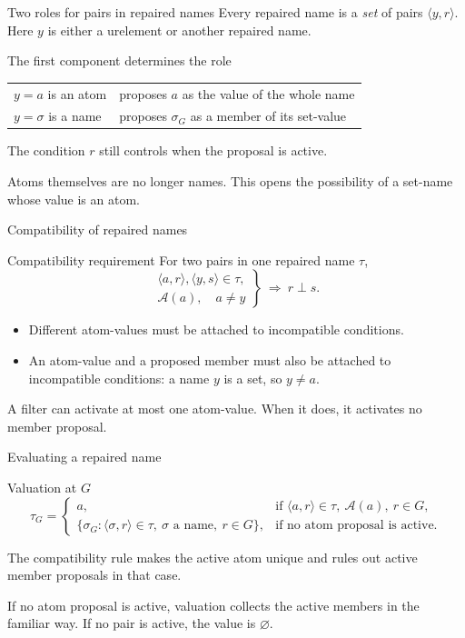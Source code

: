 \documentclass[aspectratio=169,11pt]{beamer}
\begin{document}
\begin{frame}[t]{Two roles for pairs in repaired names}
Every repaired name is a \emph{set} of pairs $\langle y,r\rangle$.
Here $y$ is either a urelement or another repaired name.
\begin{block}{The first component determines the role}
\begin{tabular}{@{}ll@{}}
$y=a$ is an atom & proposes $a$ as the value of the whole name\\[7pt]
$y=\sigma$ is a name & proposes $\sigma_G$ as a member of its set-value
\end{tabular}
\end{block}
The condition $r$ still controls when the proposal is active.
\medskip\par
Atoms themselves are no longer names. This opens the possibility of a set-name whose value is an atom.
\end{frame}

\begin{frame}[t]{Compatibility of repaired names}
\begin{block}{Compatibility requirement}
For two pairs in one repaired name $\tau$,
\[
\left.
\begin{gathered}
\langle a,r\rangle,\langle y,s\rangle\in\tau,\\
\mathcal A(a),\quad a\ne y
\end{gathered}
\right\}\ \Longrightarrow\ r\perp s.
\]
\end{block}
\begin{itemize}
\item Different atom-values must be attached to incompatible conditions.
\item An atom-value and a proposed member must also be attached to incompatible conditions: a name $y$ is a set, so $y\ne a$.
\end{itemize}
A filter can activate at most one atom-value. When it does, it activates no member proposal.
\end{frame}

\begin{frame}[t]{Evaluating a repaired name}
\begin{block}{Valuation at $G$}
\[
\tau_G=
\begin{cases}
a,&\text{if }\langle a,r\rangle\in\tau,\ \mathcal A(a),\ r\in G,\\[4pt]
\{\sigma_G:\langle\sigma,r\rangle\in\tau,\ \sigma\text{ a name},\ r\in G\},
&\text{if no atom proposal is active.}
\end{cases}
\]
\end{block}
The compatibility rule makes the active atom unique and rules out active member proposals in that case.
\medskip\par
If no atom proposal is active, valuation collects the active members in the familiar way. If no pair is active, the value is $\varnothing$.
\end{frame}
\end{document}
